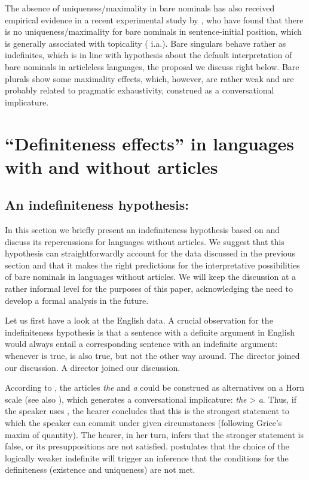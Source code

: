 \documentclass[output=paper]{langscibook}
\begin{document}
\noindent The absence of uniqueness/maximality in  bare nominals has also received empirical evidence in a recent experimental study by \citet{Simik.Demian2020}, who have found that there is no uniqueness/maximality for bare nominals in sentence-initial position, which is generally associated with topicality (\citealt{Geist2010} i.a.). Bare singulars behave rather as indefinites, which is in line with  hypothesis about the default interpretation of bare nominals in articleless languages, the proposal we discuss right below. Bare plurals show some maximality effects, which, however, are rather weak and are probably related to pragmatic exhaustivity, construed as a conversational implicature.

\section{``Definiteness effects'' in languages with and without articles}
\label{sec:definiteness-effects}
\subsection{An indefiniteness hypothesis: \citet{Heim2011}}
In this section we briefly present an indefiniteness hypothesis based on \citet{Heim2011} and discuss its repercussions for languages without articles. We suggest that this hypothesis can straightforwardly account for the data discussed in the previous section and that it makes the right predictions for the interpretative possibilities of bare nominals in languages without articles. We will keep the discussion at a rather informal level for the purposes of this paper, acknowledging the need to develop a formal analysis in the future.

Let us
first have a look at the English data.
A crucial observation for the indefiniteness hypothesis is that a sentence with a definite argument in English would always entail a corresponding sentence with an indefinite argument: whenever  is true,  is also true, but not the other way around.
\ea
\ea \label{ex:seres:27a}
The director joined our discussion.
\ex \label{ex:seres:27b}
A director joined our discussion.
\z \z

\noindent According to \citet{Heim2011}, the articles \textit{the} and \textit{a} could be construed as alternatives on a Horn scale (see also \citealt{Hawkins1978}), %
which generates a conversational implicature: \textit{the} > \textit{a}. Thus, if the speaker uses , the hearer concludes that this is the strongest statement to which the speaker can commit under given circumstances (following Grice's maxim of quantity). The hearer, in her turn, infers that the stronger statement is false, or its presuppositions are not satisfied. \citet{Heim2011} postulates that the choice of the logically weaker indefinite will trigger an inference that the conditions for the definiteness (existence and uniqueness) are not met.
\end{document}
